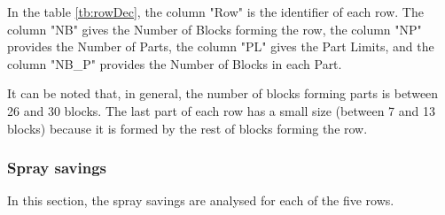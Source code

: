\documentclass[preprint,3p,times,twocolumn]{elsarticle}
\begin{document}
In the table \ref{tb:rowDec}, the column "Row" is the identifier of each row. The column "NB" gives the Number of Blocks forming the row, the column "NP" provides the Number of Parts, the column "PL" gives the Part Limits, and the column "NB\_P" provides the Number of Blocks in each Part.
\begin{table}[ht]
	\begin{center}
		\caption{Row decomposition}\label{tb:rowDec}
	\end{center}
\end{table}

It can be noted that, in general, the number of blocks forming parts is between 26 and 30 blocks. The last part of each row has a small size (between 7 and 13 blocks) because it is formed by the rest of blocks forming the row.
\subsubsection{Spray savings}
In this section, the spray savings are analysed for each of the five rows. 
\end{document}
